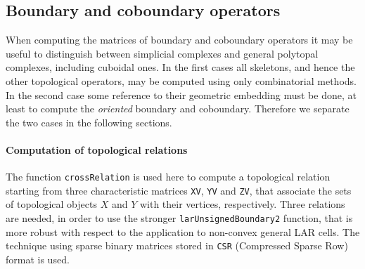 \documentclass[11pt,oneside]{article}    %
\begin{document}
\subsection{Boundary and coboundary operators}

When computing the matrices of boundary and coboundary operators it may be useful to distinguish between simplicial complexes and general polytopal complexes, including  cuboidal ones. In the first cases all skeletons, and hence the other topological operators, may be computed using only combinatorial methods. In the second case some reference to their geometric embedding must be done, at least to compute the \emph{oriented} boundary and coboundary. Therefore we separate the two cases in the following sections.



\paragraph{Computation of topological relations} 
The function \texttt{crossRelation} is used here to compute a topological relation starting from three characteristic matrices \texttt{XV}, \texttt{YV} and \texttt{ZV}, that associate the sets of topological objects $X$ and $Y$ with their vertices, respectively. 
Three relations are needed, in order to use the stronger \texttt{larUnsignedBoundary2} function, that is more robust with respect to the application to non-convex general LAR cells. 
The technique using sparse binary matrices stored in \texttt{CSR} (Compressed Sparse Row) format is used.
\end{document}
